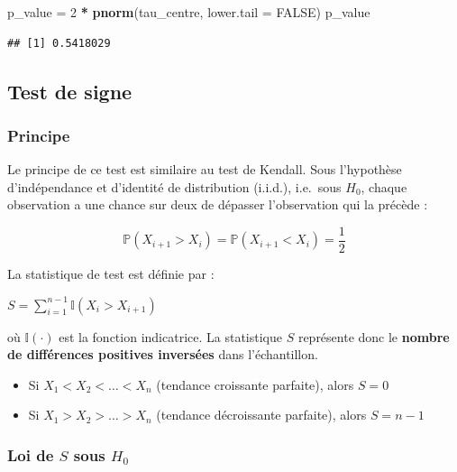 \documentclass[
  12pt,
]{article}
\newenvironment{Shaded}{\begin{snugshade}}{\end{snugshade}}
\newcommand{\AttributeTok}[1]{\textcolor[rgb]{0.13,0.29,0.53}{#1}}
\newcommand{\ConstantTok}[1]{\textcolor[rgb]{0.56,0.35,0.01}{#1}}
\newcommand{\DecValTok}[1]{\textcolor[rgb]{0.00,0.00,0.81}{#1}}
\newcommand{\FunctionTok}[1]{\textcolor[rgb]{0.13,0.29,0.53}{\textbf{#1}}}
\newcommand{\NormalTok}[1]{#1}
\newcommand{\OtherTok}[1]{\textcolor[rgb]{0.56,0.35,0.01}{#1}}
\newcommand{\SpecialCharTok}[1]{\textcolor[rgb]{0.81,0.36,0.00}{\textbf{#1}}}
\providecommand{\tightlist}{%
  \setlength{\itemsep}{0pt}\setlength{\parskip}{0pt}}
\begin{document}
\begin{Shaded}
\begin{Highlighting}[]
\NormalTok{p\_value }\OtherTok{=} \DecValTok{2} \SpecialCharTok{*} \FunctionTok{pnorm}\NormalTok{(tau\_centre, }\AttributeTok{lower.tail =} \ConstantTok{FALSE}\NormalTok{)}
\NormalTok{p\_value}
\end{Highlighting}
\end{Shaded}

\begin{verbatim}
## [1] 0.5418029
\end{verbatim}

\subsection{Test de signe}\label{test-de-signe}

\subsubsection{Principe}\label{principe}

Le principe de ce test est similaire au test de Kendall. Sous
l'hypothèse d'indépendance et d'identité de distribution (i.i.d.),
i.e.~sous \(H_0\), chaque observation a une chance sur deux de dépasser
l'observation qui la précède :

\[
\mathbb{P}(X_{i+1} > X_i) = \mathbb{P}(X_{i+1} < X_i) = \frac{1}{2}
\]

La statistique de test est définie par :

\(S = \sum_{i=1}^{n-1} \mathbb{I}(X_i > X_{i+1})\)

où \(\mathbb{I}(\cdot)\) est la fonction indicatrice. La statistique
\(S\) représente donc le \textbf{nombre de différences positives
inversées} dans l'échantillon.

\begin{itemize}
\tightlist
\item
  Si \(X_1 < X_2 < \dots < X_n\) (tendance croissante parfaite), alors
  \(S = 0\)
\item
  Si \(X_1 > X_2 > \dots > X_n\) (tendance décroissante parfaite), alors
  \(S = n - 1\)
\end{itemize}

\subsubsection{\texorpdfstring{Loi de \(S\) sous
\(H_0\)}{Loi de S sous H\_0}}\label{loi-de-s-sous-h_0}
\end{document}
